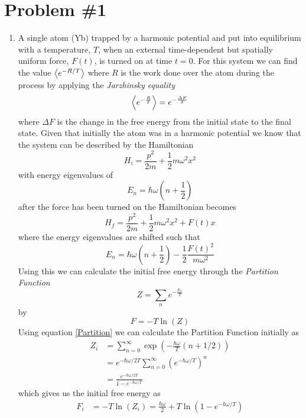 \documentclass[11pt]{article}
\numberwithin{equation}{section}
\begin{document}


\section{Problem \#1}
\begin{enumerate}[(1)]
\item A single atom (Yb) trapped by a harmonic potential and put into equilibrium with a
temperature, $T$, when an external time-dependent but spatially uniform force, $F(t)$, is turned on
at time $t=0$. For this system we can find the value $\left\langle{e^{-R/T}}\right\rangle$ where $R$ is the 
work done over the atom during the process by applying the \emph{Jarzhinsky equality}
\begin{equation}
\left\langle{e^{-\frac{R}{T}}}\right\rangle = e^{-\frac{\Delta{F}}{T}}
\label{JarEqual}
\end{equation}
where $\Delta{F}$ is the change in the free energy from the initial state to the final state.
Given that initially the atom was in a harmonic potential we know that the system can be 
described by the Hamiltonian
$$H_{i} = \frac{p^2}{2m} + \frac{1}{2}m\omega^2x^2$$
with energy eigenvalues of
$$E_{n} = \hbar\omega\left(n+\frac{1}{2}\right)$$
after the force has been turned on the Hamiltonian becomes
$$H_{f} = \frac{p^2}{2m} + \frac{1}{2}m\omega^2x^2 + F(t)x$$
where the energy eigenvalues are shifted such that
$$E_{n} = \hbar\omega\left(n+\frac{1}{2}\right) - \frac{1}{2}\frac{F(t)^2}{m\omega^2}$$
Using this we can calculate the initial free energy through the \emph{Partition Function}
\begin{equation}
Z = \sum_{n}e^{-\frac{E_n}{T}}
\label{Partition}
\end{equation}
by
\begin{equation}
F = -T\ln(Z)
\label{FreePart}
\end{equation}
Using equation \ref{Partition} we can calculate the Partition Function initially as
\begin{align*}
Z_i &= \sum_{n=0}^{\infty}\exp\left(-\frac{\hbar\omega}{T}(n+1/2)\right)\\
&= e^{-\hbar\omega/2T}\sum_{n=0}^{\infty}\left(e^{-\hbar\omega/T}\right)^n\\
&= \frac{e^{-\hbar\omega/2T}}{1-e^{-\hbar\omega/T}}
\end{align*}
which gives us the initial free energy as
\begin{align*}
F_i &= -T\ln(Z_i) = \frac{\hbar\omega}{2} + T\ln\left(1-e^{-\hbar\omega/T}\right)
\end{align*}

\end{enumerate}
\end{document}
